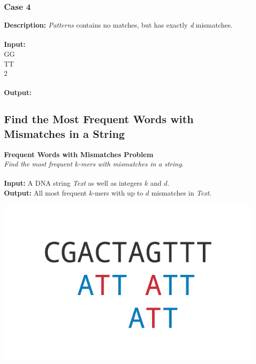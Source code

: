 \documentclass{article}
\newcommand{\code}[1]{{\fontfamily{pcr}\selectfont #1}}
\begin{document}
\subsubsection*{Case 4}
\hline \vspace{5}
\textbf{Description:} \emph{Patterns} contains no matches, but has exactly \emph{d} mismatches.\\ \\
\noindent \textbf{Input:}\\
\code{GG \\ TT\\ 2}\\ \\
\noindent \textbf{Output:}\\
\code{0}
\pagebreak
\subsection{Find the Most Frequent Words with Mismatches in a String}
\hline\vspace{5}
\noindent \textbf{Frequent Words with Mismatches Problem}\\
\emph{Find the most frequent $k$-mers with mismatches in a string}.\\ \\
\textbf{Input:} A DNA string \emph{Text} as well as integers $k$ and $d$.\\
\textbf{Output:} All most frequent $k$-mers with up to $d$ mismatches in \emph{Text}.
\begin{center}
    \includegraphics[scale=0.2]{c1/logos/1I.png} 
\end{center}
\hline\vspace{5}
\end{document}
